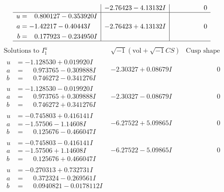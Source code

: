 \documentclass[1p]{elsarticle_modified}
\theoremstyle{definition}
\newcommand{\I}{\sqrt{-1}}
\begin{document}
$$\begin{array}{c|c|c}
 & -2.76423 - 4.13132 I & \phantom{-0.000000 } 0 \\ \hline\begin{aligned}
u &= \phantom{-}0.800127 - 0.353920 I \\
a &= -1.42217 - 0.40443 I \\
b &= \phantom{-}0.177923 - 0.234950 I\end{aligned}
 & -2.76423 + 4.13132 I & \phantom{-0.000000 } 0\\
 \hline 
 \end{array}$$\newpage$$\begin{array}{c|c|c}  
\text{Solutions to }I^u_{1}& \I (\text{vol} + \sqrt{-1}CS) & \text{Cusp shape}\\
 \hline 
\begin{aligned}
u &= -1.128530 + 0.019920 I \\
a &= \phantom{-}0.973765 - 0.309888 I \\
b &= \phantom{-}0.746272 - 0.341276 I\end{aligned}
 & -2.30327 + 0.08679 I & \phantom{-0.000000 } 0 \\ \hline\begin{aligned}
u &= -1.128530 - 0.019920 I \\
a &= \phantom{-}0.973765 + 0.309888 I \\
b &= \phantom{-}0.746272 + 0.341276 I\end{aligned}
 & -2.30327 - 0.08679 I & \phantom{-0.000000 } 0 \\ \hline\begin{aligned}
u &= -0.745803 + 0.416141 I \\
a &= -1.57506 - 1.14608 I \\
b &= \phantom{-}0.125676 - 0.466047 I\end{aligned}
 & -6.27522 + 5.09865 I & \phantom{-0.000000 } 0 \\ \hline\begin{aligned}
u &= -0.745803 - 0.416141 I \\
a &= -1.57506 + 1.14608 I \\
b &= \phantom{-}0.125676 + 0.466047 I\end{aligned}
 & -6.27522 - 5.09865 I & \phantom{-0.000000 } 0 \\ \hline\begin{aligned}
u &= -0.270313 + 0.732731 I \\
a &= \phantom{-}0.372324 - 0.269561 I \\
b &= \phantom{-}0.0940821 - 0.0178112 I\end{aligned}

\end{array}$$
\end{document}
